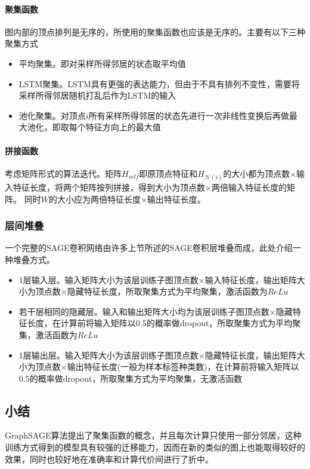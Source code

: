 \paragraph{聚集函数}
图内部的顶点排列是无序的，所使用的聚集函数也应该是无序的。主要有以下三种聚集方式
\begin{itemize}
    \item 平均聚集。即对采样所得邻居的状态取平均值
    \item LSTM聚集。LSTM具有更强的表达能力，但由于不具有排列不变性，需要将采样所得邻居随机打乱后作为LSTM的输入
    \item 池化聚集。对顶点$i$所有采样所得邻居的状态先进行一次非线性变换后再做最大池化，即取每个特征方向上的最大值
\end{itemize}

\paragraph{拼接函数}
考虑矩阵形式的算法迭代。矩阵$H_{self}$即原顶点特征和$H_{\mathcal{N}(i)}$的大小都为顶点数$\times$输入特征长度，将两个矩阵按列拼接，得到大小为顶点数$\times$两倍输入特征长度的矩阵。
同时$W$的大小应为两倍特征长度$\times$输出特征长度。

\subsubsection{层间堆叠}
一个完整的SAGE卷积网络由许多上节所述的SAGE卷积层堆叠而成，此处介绍一种堆叠方式。

\begin{itemize}
    \item 1层输入层。输入矩阵大小为该层训练子图顶点数$\times$输入特征长度，输出矩阵大小为顶点数$\times$隐藏特征长度，所取聚集方式为平均聚集，激活函数为$ReLu$
    \item 若干层相同的隐藏层。输入和输出矩阵大小均为该层训练子图顶点数$\times$隐藏特征长度，在计算前将输入矩阵以0.5的概率做dropout，所取聚集方式为平均聚集，激活函数为$ReLu$
    \item 1层输出层。输入矩阵大小为该层训练子图顶点数$\times$隐藏特征长度，输出矩阵大小为顶点数$\times$输出特征长度(一般为样本标签种类数)，在计算前将输入矩阵以0.5的概率做dropout，所取聚集方式为平均聚集，无激活函数
\end{itemize}

\subsection{小结}
GraphSAGE算法提出了聚集函数的概念，并且每次计算只使用一部分邻居，这种训练方式得到的模型具有较强的迁移能力，因而在新的类似的图上也能取得较好的效果，同时也较好地在准确率和计算代价间进行了折中。


